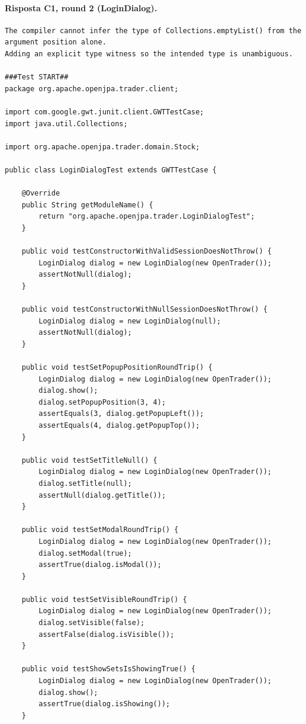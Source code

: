 \paragraph*{Risposta C1, round 2 (LoginDialog).}
\label{risposta:ld-c1-r2}
\begin{lstlisting}
The compiler cannot infer the type of Collections.emptyList() from the argument position alone.
Adding an explicit type witness so the intended type is unambiguous.

###Test START##
package org.apache.openjpa.trader.client;

import com.google.gwt.junit.client.GWTTestCase;
import java.util.Collections;

import org.apache.openjpa.trader.domain.Stock;

public class LoginDialogTest extends GWTTestCase {

    @Override
    public String getModuleName() {
        return "org.apache.openjpa.trader.LoginDialogTest";
    }

    public void testConstructorWithValidSessionDoesNotThrow() {
        LoginDialog dialog = new LoginDialog(new OpenTrader());
        assertNotNull(dialog);
    }

    public void testConstructorWithNullSessionDoesNotThrow() {
        LoginDialog dialog = new LoginDialog(null);
        assertNotNull(dialog);
    }

    public void testSetPopupPositionRoundTrip() {
        LoginDialog dialog = new LoginDialog(new OpenTrader());
        dialog.show();
        dialog.setPopupPosition(3, 4);
        assertEquals(3, dialog.getPopupLeft());
        assertEquals(4, dialog.getPopupTop());
    }

    public void testSetTitleNull() {
        LoginDialog dialog = new LoginDialog(new OpenTrader());
        dialog.setTitle(null);
        assertNull(dialog.getTitle());
    }

    public void testSetModalRoundTrip() {
        LoginDialog dialog = new LoginDialog(new OpenTrader());
        dialog.setModal(true);
        assertTrue(dialog.isModal());
    }

    public void testSetVisibleRoundTrip() {
        LoginDialog dialog = new LoginDialog(new OpenTrader());
        dialog.setVisible(false);
        assertFalse(dialog.isVisible());
    }

    public void testShowSetsIsShowingTrue() {
        LoginDialog dialog = new LoginDialog(new OpenTrader());
        dialog.show();
        assertTrue(dialog.isShowing());
    }


\end{lstlisting}
